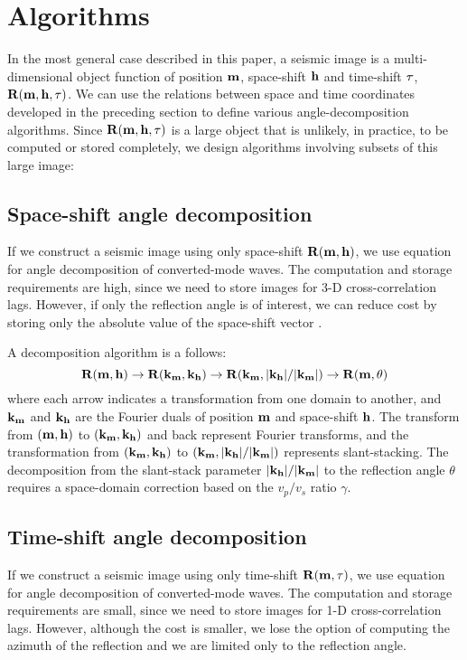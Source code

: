 \section{Algorithms}
In the most general case described in this paper, a seismic image 
is a multi-dimensional object function of position $\mm$,
space-shift $\hh$ and time-shift $\tt$, $\RR(\mm,\hh,\tt)$.
We can use the relations between space and time coordinates
developed in the preceding section to define various 
angle-decomposition algorithms. 
Since $\RR(\mm,\hh,\tt)$ is a large object that is unlikely, in practice,
to be computed or stored completely, we design algorithms involving
subsets of this large image:

\subsection{Space-shift angle decomposition}
If we construct a seismic image using only space-shift $\RR(\mm,\hh)$,
we use equation~ for angle decomposition of converted-mode waves.
The computation and storage requirements are high, since
we need to store images for 3-D cross-correlation lags.
However, if only the reflection angle is of interest, we can 
reduce cost by storing only the absolute value of the space-shift
vector \cite[]{SavaFomel.segab2.2005}.

A decomposition algorithm is a follows:
\[
\RR(\mm,\hh) \rightarrow
\RR(\kmv,\khv) \rightarrow
\RR(\kmv,\mkh/\mkm) \rightarrow
\RR(\mm,\theta)
\]
where each arrow indicates a transformation from one domain
to another, and $\kmv$ and $\khv$ are the Fourier duals of
position $\mm$ and space-shift $\hh$.
The transform from $(\mm,\hh)$ to $(\kmv,\khv)$ and back
represent Fourier transforms, and the transformation
from $(\kmv,\khv)$ to $(\kmv,\mkh/\mkm)$ represents slant-stacking.
The decomposition
from the slant-stack parameter $\mkh/\mkm$ to the
reflection angle $\theta$ requires a 
space-domain correction based on the $v_p/v_s$ ratio $\gamma$.

\subsection{Time-shift angle decomposition}
If we construct a seismic image using only time-shift $\RR(\mm,\tt)$,
we use equation~ for angle decomposition
of converted-mode waves.
The computation and storage requirements are small, since
we need to store images for 1-D cross-correlation lags.
However, although the cost is smaller, we lose the option of computing
the azimuth of the reflection and we are limited only to the 
reflection angle.


